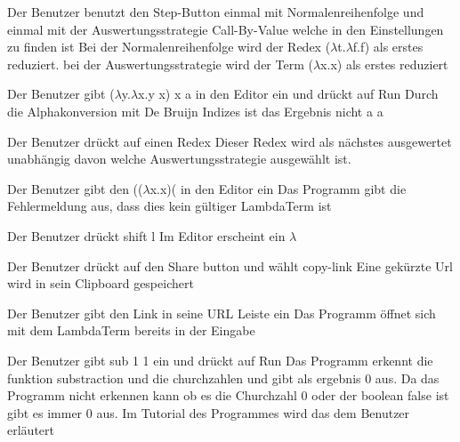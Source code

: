 \documentclass[parskip=full,11pt,twoside]{scrartcl}
\begin{document}
{Der Benutzer benutzt den Step-Button einmal mit Normalenreihenfolge  und einmal mit der Auswertungsstrategie Call-By-Value welche in den Einstellungen zu finden ist}
{ Bei der Normalenreihenfolge wird der Redex ($\lambda$t.$\lambda$f.f) als erstes reduziert. bei der Auswertungsstrategie wird der Term ($\lambda$x.x) als erstes reduziert }

{ Der Benutzer gibt ($\lambda$y.$\lambda$x.y x) x a in den Editor ein und drückt auf Run}
{ Durch die Alphakonversion mit De Bruijn Indizes ist das Ergebnis nicht a  a  }

 { Der Benutzer drückt auf einen Redex}
{ Dieser Redex wird als nächstes ausgewertet unabhängig davon welche Auswertungsstrategie ausgewählt ist. }

{ Der Benutzer gibt den (($\lambda$x.x)( in den Editor ein }
{ Das Programm gibt die Fehlermeldung aus, dass dies kein gültiger LambdaTerm ist }

{ Der Benutzer drückt shift l }
{Im Editor erscheint ein $\lambda$}

{ Der Benutzer drückt auf den Share button und wählt copy-link}
{ Eine gekürzte Url wird in sein Clipboard gespeichert }

{Der Benutzer gibt den Link in seine URL Leiste ein }
{ Das Programm öffnet sich mit dem LambdaTerm bereits in der Eingabe }

{ Der Benutzer gibt sub 1 1 ein und drückt auf Run }
{ Das Programm erkennt die funktion substraction und die churchzahlen und gibt als ergebnis 0 aus. Da das Programm nicht erkennen kann ob es die Churchzahl 0 oder der boolean false ist gibt es immer 0 aus. Im Tutorial des Programmes wird das dem Benutzer erläutert }





\end{document}
